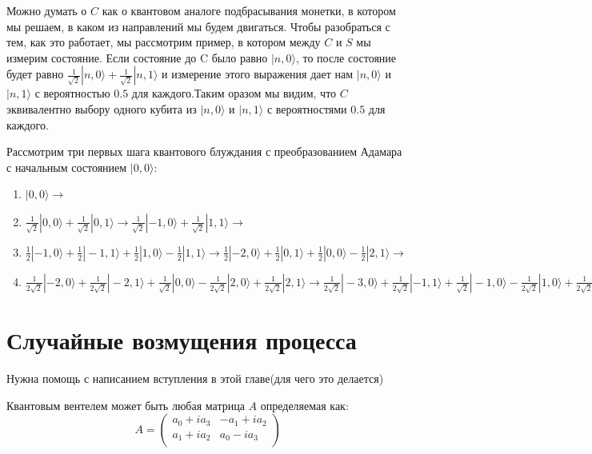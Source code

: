 \documentclass[a4paper]{report}
\begin{document}
Можно думать о $C$ как о квантовом аналоге подбрасывания монетки, в котором мы решаем, в каком из направлений мы будем двигаться. Чтобы разобраться с тем, как это работает, мы рассмотрим пример, в котором между $C$ и $S$ мы измерим состояние.  Если состояние до C было равно $|n, 0\rangle$, то после состояние будет равно
$\frac{1}{\sqrt{2}} |n,0\rangle + \frac{1}{\sqrt{2}}|n,1\rangle$ и измерение этого выражения дает нам $|n,0\rangle$ и $|n,1\rangle$ с вероятностью $0.5$ для каждого.Таким оразом мы видим, что $C$ эквивалентно выбору одного кубита из $|n,0\rangle$ и $|n,1\rangle$ с вероятностями $0.5$ для каждого.

Рассмотрим три первых шага квантового блуждания с преобразованием Адамара с начальным состоянием $|0, 0\rangle$:

\begin{enumerate}
     \item $|0, 0\rangle \rightarrow$
     \item $\frac{1}{\sqrt{2}}|0, 0\rangle + \frac{1}{\sqrt{2}}|0, 1\rangle \rightarrow \frac{1}{\sqrt{2}}|-1, 0\rangle + \frac{1}{\sqrt{2}}|1, 1\rangle \rightarrow$
     \item $\frac{1}{2}|-1, 0\rangle + \frac{1}{2}|-1, 1\rangle + \frac{1}{2}|1, 0\rangle - \frac{1}{2}|1, 1\rangle \rightarrow \frac{1}{2}|-2, 0\rangle + \frac{1}{2}|0, 1\rangle + \frac{1}{2}|0, 0\rangle - \frac{1}{2}|2, 1\rangle \rightarrow$
     \item $\frac{1}{2\sqrt{2}}|-2, 0\rangle + \frac{1}{2\sqrt{2}}|-2, 1\rangle + \frac{1}{\sqrt{2}}|0, 0\rangle - \frac{1}{2\sqrt{2}}|2, 0\rangle + \frac{1}{2\sqrt{2}}|2, 1\rangle \rightarrow \frac{1}{2\sqrt{2}}|-3, 0\rangle + \frac{1}{2\sqrt{2}}|-1, 1\rangle + \frac{1}{\sqrt{2}}|-1, 0\rangle - \frac{1}{2\sqrt{2}}|1, 0\rangle + \frac{1}{2\sqrt{2}}|3, 1\rangle$
\end{enumerate}


\section{Случайные возмущения процесса}

Нужна помощь с написанием вступления в этой главе(для чего это делается)

Квантовым вентелем может быть любая матрица $A$ определяемая как:
\begin{equation}
   A = \left(
      \begin{array}{cc}
        a_{0}+ i a_{3} & -a_{1} + i a_{2} \\
        a_{1} + i a_{2} & a_{0} - i a_{3} \\
      \end{array}
    \right)
\end{equation}
\end{document}

